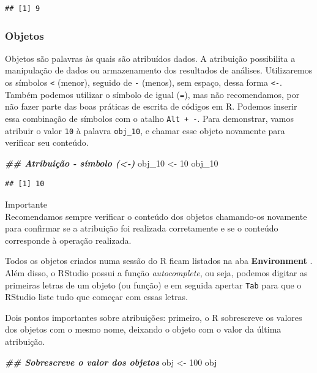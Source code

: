 \documentclass[
]{article}
\newenvironment{Shaded}{\begin{snugshade}}{\end{snugshade}}
\newcommand{\DecValTok}[1]{\textcolor[rgb]{0.00,0.00,0.81}{#1}}
\newcommand{\DocumentationTok}[1]{\textcolor[rgb]{0.56,0.35,0.01}{\textbf{\textit{#1}}}}
\newcommand{\NormalTok}[1]{#1}
\newcommand{\OtherTok}[1]{\textcolor[rgb]{0.56,0.35,0.01}{#1}}
\begin{document}
\begin{verbatim}
## [1] 9
\end{verbatim}

\hypertarget{objetos}{%
\subsubsection{Objetos}\label{objetos}}

Objetos são palavras às quais são atribuídos dados. A atribuição possibilita a manipulação de dados ou armazenamento dos resultados de análises. Utilizaremos os símbolos \texttt{\textless{}} (menor), seguido de \texttt{-} (menos), sem espaço, dessa forma \texttt{\textless{}-}. Também podemos utilizar o símbolo de igual (\texttt{=}), mas não recomendamos, por não fazer parte das boas práticas de escrita de códigos em R. Podemos inserir essa combinação de símbolos com o atalho \texttt{Alt\ +\ -}. Para demonstrar, vamos atribuir o valor \texttt{10} à palavra \texttt{obj\_10}, e chamar esse objeto novamente para verificar seu conteúdo.

\begin{Shaded}
\begin{Highlighting}[]
\DocumentationTok{\#\# Atribuição {-} símbolo (\textless{}{-})}
\NormalTok{obj\_10 }\OtherTok{\textless{}{-}} \DecValTok{10}
\NormalTok{obj\_10}
\end{Highlighting}
\end{Shaded}

\begin{verbatim}
## [1] 10
\end{verbatim}

Importante \\
Recomendamos sempre verificar o conteúdo dos objetos chamando-os novamente para confirmar se a atribuição foi realizada corretamente e se o conteúdo corresponde à operação realizada.

Todos os objetos criados numa sessão do R ficam listados na aba \textbf{Environment} . Além disso, o RStudio possui a função \emph{autocomplete}, ou seja, podemos digitar as primeiras letras de um objeto (ou função) e em seguida apertar \texttt{Tab} para que o RStudio liste tudo que começar com essas letras.

Dois pontos importantes sobre atribuições: primeiro, o R sobrescreve os valores dos objetos com o mesmo nome, deixando o objeto com o valor da última atribuição.

\begin{Shaded}
\begin{Highlighting}[]
\DocumentationTok{\#\# Sobrescreve o valor dos objetos}
\NormalTok{obj }\OtherTok{\textless{}{-}} \DecValTok{100}
\NormalTok{obj}
\end{Highlighting}
\end{Shaded}
\end{document}
